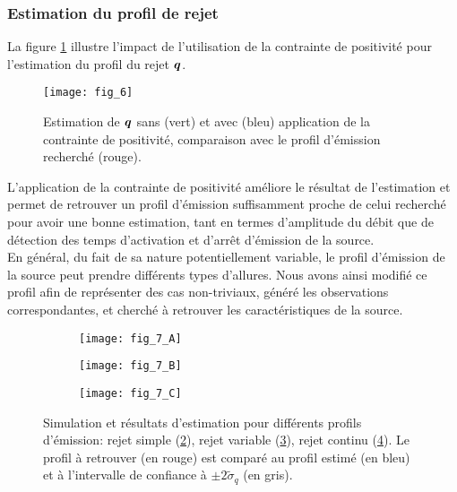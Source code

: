   \subsubsection{Estimation du profil de rejet}
  
  La figure \ref{fig_6_AE} illustre l'impact de l'utilisation de la contrainte de positivité pour l'estimation du profil du rejet ${\bm{q}}$.
  
 \begin{figure}[h!]
 	\centering
 	\texttt{[image: fig\_6]}
 	\caption{Estimation de ${\bm{q}}$ sans (vert) et avec (bleu) application de la contrainte de positivité, comparaison avec le profil d'émission recherché (rouge).}
 	\label{fig_6_AE}
 \end{figure}
 
 L'application de la contrainte de positivité améliore le résultat de l'estimation et permet de retrouver un profil d'émission suffisamment proche de celui recherché pour avoir une bonne estimation, tant en termes d'amplitude du débit que de détection des temps d'activation et d'arrêt d'émission de la source.\\
 
 En général, du fait de sa nature potentiellement variable, le profil d'émission de la source peut prendre différents types d'allures. Nous avons ainsi modifié ce profil afin de représenter des cas non-triviaux, généré les observations correspondantes, et cherché à retrouver les caractéristiques de la source. \\
 
  \begin{figure}[h!]
  	\centering
  	\begin{subfigure}[t]{0.5\textwidth}
  		\centering
  		\texttt{[image: fig\_7\_A]}
  		\caption{}
  		\label{fig_AE_7_A}
  	\end{subfigure}%
  	\begin{subfigure}[t]{0.5\textwidth}
  		\centering
  		\texttt{[image: fig\_7\_B]}
  		\caption{}
  		\label{fig_AE_7_B}
  	\end{subfigure}
  	\begin{subfigure}[t]{0.5\textwidth}
  		\centering
  		\texttt{[image: fig\_7\_C]}
  		\caption{}
  		\label{fig_AE_7_C}
  	\end{subfigure} 
  	
  	\caption{Simulation et résultats d'estimation pour différents profils d'émission: rejet simple (\ref{fig_AE_7_A}), rejet variable (\ref{fig_AE_7_B}), rejet continu (\ref{fig_AE_7_C}). Le profil à retrouver (en rouge) est comparé au profil estimé (en bleu) et à l'intervalle de confiance à $\pm 2 \widetilde{\sigma}_q$ (en gris).}
  	\label{fig_AE_7}	
  \end{figure}
  

